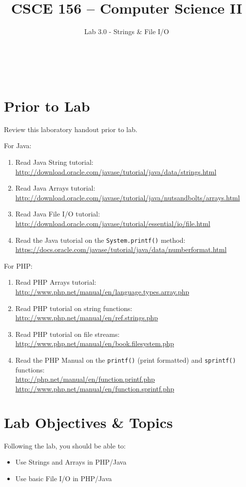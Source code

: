 \documentclass[12pt]{scrartcl}
\title{CSCE 156 -- Computer Science II}
\subtitle{Lab 3.0 - Strings \& File I/O}
\author{~}
\date{~}
\begin{document}
\maketitle

\section*{Prior to Lab}

Review this laboratory handout prior to lab.

For Java:
\begin{enumerate}
  \item Read Java String tutorial: \\
	\url{http://download.oracle.com/javase/tutorial/java/data/strings.html}
  \item Read Java Arrays tutorial: \\
	\url{http://download.oracle.com/javase/tutorial/java/nutsandbolts/arrays.html}
  \item Read Java File I/O tutorial: \\
  	\url{http://download.oracle.com/javase/tutorial/essential/io/file.html}
  \item Read the Java tutorial on the \texttt{System.printf()} 
	method: \\
	\url{https://docs.oracle.com/javase/tutorial/java/data/numberformat.html}
\end{enumerate}

For PHP:
\begin{enumerate}
  \item Read PHP Arrays tutorial: \\
    \url{http://www.php.net/manual/en/language.types.array.php}
  \item Read PHP tutorial on string functions: \\
	\url{http://www.php.net/manual/en/ref.strings.php}
  \item Read PHP tutorial on file streams: \\
	\url{http://www.php.net/manual/en/book.filesystem.php}
  \item Read the PHP Manual on the \texttt{printf()} 
    (print formatted) and \texttt{sprintf()} functions:\\
	\url{http://php.net/manual/en/function.printf.php}\\
	\url{http://www.php.net/manual/en/function.sprintf.php}
\end{enumerate}

\section*{Lab Objectives \& Topics}
Following the lab, you should be able to:
\begin{itemize}
  \item Use Strings and Arrays in PHP/Java
  \item Use basic File I/O in PHP/Java
\end{itemize}
\end{document}
